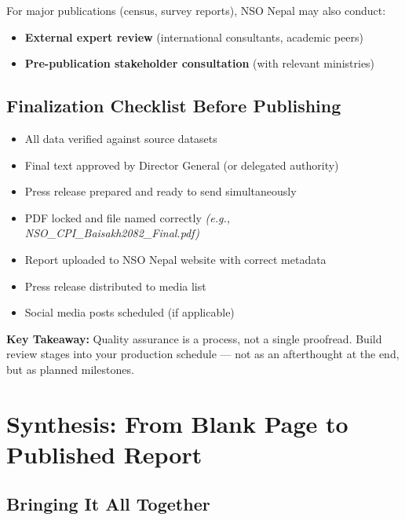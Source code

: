 \documentclass[11pt,a4paper,oneside]{book}
\begin{document}
For major publications (census, survey reports), NSO Nepal may also conduct:
\begin{itemize}
    \item \textbf{External expert review} (international consultants, academic peers)
    \item \textbf{Pre-publication stakeholder consultation} (with relevant ministries)
\end{itemize}

\section{Finalization Checklist Before Publishing}

\begin{itemize}
    \item[\(\square\)] All data verified against source datasets
    \item[\(\square\)] Final text approved by Director General (or delegated authority)
    \item[\(\square\)] Press release prepared and ready to send simultaneously
    \item[\(\square\)] PDF locked and file named correctly \emph{(e.g., NSO\_CPI\_Baisakh2082\_Final.pdf)}
    \item[\(\square\)] Report uploaded to NSO Nepal website with correct metadata
    \item[\(\square\)] Press release distributed to media list
    \item[\(\square\)] Social media posts scheduled (if applicable)
\end{itemize}

\begin{tcolorbox}[nsolightbox]
\textbf{Key Takeaway:} Quality assurance is a process, not a single proofread. Build review stages into your production schedule --- not as an afterthought at the end, but as planned milestones.
\end{tcolorbox}


\chapter{Synthesis: From Blank Page to Published Report}

\section{Bringing It All Together}
\end{document}
